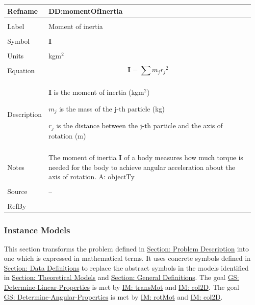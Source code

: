 \documentclass[12pt]{article}
\begin{document}
\noindent \begin{minipage}{\textwidth}
\begin{tabular}{>{\raggedright}p{}>{\raggedright\arraybackslash}p{}}
\toprule \textbf{Refname} & \textbf{DD:momentOfInertia}
\label{DD:momentOfInertia}
\\ \midrule \\
Label & Moment of inertia
\\ \midrule \\
Symbol & $\mathbf{I}$
\\ \midrule \\
Units & kg$\text{m}^{2}$
\\ \midrule \\
Equation & \begin{displaymath}
           \mathbf{I}=\displaystyle\sum{{m_{j}} {r_{j}}^{2}}
           \end{displaymath}
\\ \midrule \\
Description & \begin{symbDescription}
              \item{$\mathbf{I}$ is the moment of inertia (kg$\text{m}^{2}$)}
              \item{${m_{j}}$ is the mass of the j-th particle (kg)}
              \item{${r_{j}}$ is the distance between the j-th particle and the axis of rotation (m)}
              \end{symbDescription}
\\ \midrule \\
Notes & The moment of inertia $\mathbf{I}$ of a body measures how much torque is needed for the body to achieve angular acceleration about the axis of rotation.
        \hyperref[assumpOT]{A: objectTy}
\\ \midrule \\
Source & --
\\ \midrule \\
RefBy & 
\\ \bottomrule
\end{tabular}
\end{minipage}
\subsubsection{Instance Models}
\label{Sec:IMs}
This section transforms the problem defined in \hyperref[Sec:ProbDesc]{Section: Problem Description} into one which is expressed in mathematical terms. It uses concrete symbols defined in \hyperref[Sec:DDs]{Section: Data Definitions} to replace the abstract symbols in the models identified in \hyperref[Sec:TMs]{Section: Theoretical Models} and \hyperref[Sec:GDs]{Section: General Definitions}.
The goal \hyperref[linearGS]{GS: Determine-Linear-Properties} is met by \hyperref[IM:transMot]{IM: transMot} and \hyperref[IM:col2D]{IM: col2D}. The goal \hyperref[angularGS]{GS: Determine-Angular-Properties} is met by \hyperref[IM:rotMot]{IM: rotMot} and \hyperref[IM:col2D]{IM: col2D}.
\par~
\end{document}
